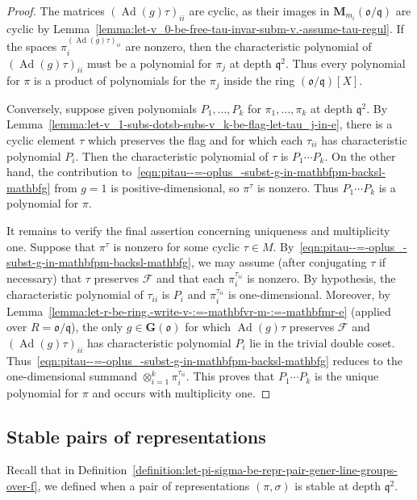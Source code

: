 \documentclass[reqno]{amsart}
\DeclareMathOperator{\Ad}{Ad}
\theoremstyle{plain} \newtheorem{theorem} {Theorem} \newtheorem{conjecture} {Conjecture} \newtheorem{corollary} [theorem] {Corollary} \newtheorem{proposition} [theorem] {Proposition} \newtheorem{fact} [theorem] {Fact}
\theoremstyle{definition} \newtheorem{definition} [theorem] {Definition}
\theoremstyle{itplain} %
\newcommand{\mfq}{\mathfrak{q}}
\begin{document}
\begin{proof}
  The matrices ${(\Ad(g) \tau)}_{i i}$ are cyclic, as their images in $\mathbf{M}_{m_i}(\mathfrak{o}/\mfq)$ are cyclic by Lemma~\ref{lemma:let-v_0-be-free-tau-invar-subm-v.-assume-tau-regul}.  If the spaces $\pi_i^{{(\Ad(g) \tau )}_{i i}}$ are nonzero, then the characteristic polynomial of ${(\Ad(g) \tau )}_{i i}$ must be a polynomial for $\pi_j$ at depth $\mfq^2$.  Thus every polynomial for $\pi$ is a product of polynomials for the $\pi_j$ inside the ring $(\mathfrak{o}/\mfq)[X]$.

  Conversely, suppose given polynomials $P_1, \dotsc, P_k$ for $\pi_1,\dotsc,\pi_k$ at depth $\mfq^2$.  By Lemma~\ref{lemma:let-v_1-subs-dotsb-subs-v_k-be-flag-let-tau_j-in-e}, there is a cyclic element $\tau$ which preserves the flag and for which each $\tau_{ii}$ has characteristic polynomial $P_i$.  Then the characteristic polynomial of $\tau$ is $P_1 \dotsb P_k$.  On the other hand, the contribution to~\eqref{eqn:pitau--=-oplus_-subst-g-in-mathbfpm-backsl-mathbfg} from $g = 1$ is positive-dimensional, so $\pi^\tau$ is nonzero.  Thus $P_1 \dotsb P_k$ is a polynomial for $\pi$.

  It remains to verify the final assertion concerning uniqueness and multiplicity one.  Suppose that $\pi^\tau$ is nonzero for some cyclic $\tau \in M$.  By~\eqref{eqn:pitau--=-oplus_-subst-g-in-mathbfpm-backsl-mathbfg}, we may assume (after conjugating $\tau$ if necessary) that $\tau$ preserves $\mathcal{F}$ and that each $\pi_i^{\tau_{ii}}$ is nonzero.  By hypothesis, the characteristic polynomial of $\tau_{ii}$ is $P_i$ and $\pi_i^{\tau_{ii}}$ is one-dimensional.  Moreover, by Lemma~\ref{lemma:let-r-be-ring.-write-v-:=-mathbfvr-m-:=-mathbfmr-e} (applied over $R = \mathfrak{o} / \mfq$), the only $g \in \mathbf{G}(\mathfrak{o})$ for which $\Ad(g) \tau$ preserves $\mathcal{F}$ and ${(\Ad(g) \tau)}_{ii}$ has characteristic polynomial $P_i$ lie in the trivial double coset. Thus~\eqref{eqn:pitau--=-oplus_-subst-g-in-mathbfpm-backsl-mathbfg} reduces to the one-dimensional summand $\otimes_{i=1}^k \pi_i^{\tau_{ii}}$.  This proves that $P_1 \dotsb P_k$ is the unique polynomial for $\pi$ and occurs with multiplicity one.
\end{proof}



\subsection{Stable pairs of representations}\label{sec:cj3m0c6cif}
Recall that in Definition~\ref{definition:let-pi-sigma-be-repr-pair-gener-line-groups-over-f}, we defined when a pair of representations $(\pi,\sigma)$ is stable at depth $\mfq^2$.
\end{document}

